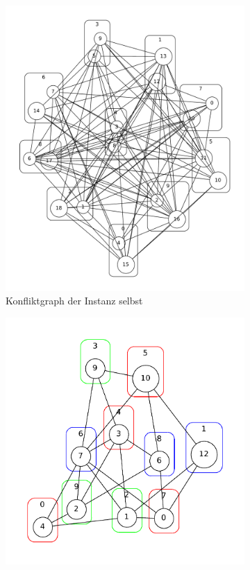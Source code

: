 \begin{figure}
	\centering
	\begin{subfigure}[t]{0.45\textwidth}
		\includegraphics[width=\textwidth]{../img/graphviz-post}
		\caption{Konfliktgraph der Instanz selbst}
		\label{fig:graphviz:pre}
	\end{subfigure}
	\begin{subfigure}[t]{0.45\textwidth}
		\includegraphics[width=\textwidth]{../img/graphviz-pre}

\end{subfigure}
\end{figure}
